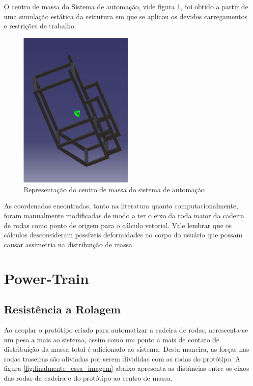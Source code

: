O centro de massa do Sistema de automação, vide figura \ref{fig:centro_massa_sistema_automocao}, foi obtido a partir de uma simulação estática da estrutura em que se aplicou os devidos carregamentos e restrições de trabalho.

\begin{figure}[!htb]
\centering
\includegraphics[width = 0.5\textwidth]{figuras/resultados/centro_massa_sistema_automocao}
\caption{Representação do centro de massa do sistema de automação}
\label{fig:centro_massa_sistema_automocao}
\end{figure}

As coordenadas encontradas, tanto na literatura quanto computacionalmente, foram manualmente modificadas de modo a ter o eixo da roda maior da cadeira de rodas como ponto de origem para o cálculo vetorial. Vale lembrar que os cálculos desconsideram possíveis deformidades no corpo do usuário que possam causar assimetria na distribuição de massa.



\section{Power-Train}

\subsection[Resistência a Rolagem]{Resistência a Rolagem}

Ao acoplar o protótipo criado para automatizar a cadeira de rodas, acrescenta-se um peso a mais ao sistema, assim como um ponto a mais de contato de distribuição da massa total é adicionado ao sistema. Desta maneira, as forças nas rodas traseiras são aliviadas por serem divididas com as rodas do protótipo. A figura \ref{fig:finalmente_essa_imagem} abaixo apresenta as distâncias entre os eixos das rodas da cadeira e do protótipo ao centro de massa.

